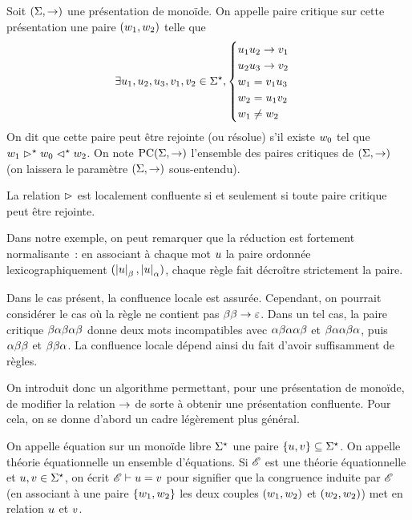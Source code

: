 \begin{definition}
  Soit $(\Sigma,\mathrel{\to})$ une présentation de monoïde. On appelle paire
  critique sur cette présentation une paire $(w_1,w_2)$
  telle que
  \[\exists u_1,u_2,u_3,v_1,v_2\in\Sigma^{\star},
  \begin{cases}
    u_1u_2\mathrel{\to} v_1\\
    u_2u_3\mathrel{\to} v_2\\
    w_1 = v_1u_3\\
    w_2 = u_1v_2\\
    w_1 \neq w_2
  \end{cases}\]
  On dit que cette paire peut être rejointe (ou résolue) s'il existe
  $w_0$ tel que $w_1\mathrel{\rhd}^{\mathord{\star}} w_0\mathrel{\lhd}^{\mathord{\star}} w_2$.
  On note $\operatorname{PC}(\Sigma,\mathrel{\to})$ l'ensemble des paires critiques de
  $(\Sigma,\mathrel{\to})$ (on laissera le paramètre $(\Sigma,\mathrel{\to})$ sous-entendu).
\end{definition}

\begin{remark}
  La relation $\mathrel{\rhd}$ est localement confluente si et seulement si toute
  paire critique peut être rejointe.
\end{remark}

Dans notre exemple, on peut remarquer que la réduction est fortement
normalisante~: en associant à chaque mot $u$ la paire ordonnée
lexicographiquement $(\left|u\right|_{\beta},\left|u\right|_{\alpha})$, chaque règle fait
décroître strictement la paire.

Dans le cas présent, la confluence locale est assurée. Cependant, on pourrait
considérer le cas où la règle ne contient pas $\beta\beta\mathrel{\to} \varepsilon$. Dans
un tel cas, la paire critique $\beta\alpha\beta\alpha\beta$ donne deux mots
incompatibles avec $\alpha\beta\alpha\alpha\beta$ et
$\beta\alpha\alpha\beta\alpha$, puis $\alpha\beta\beta$ et
$\beta\beta\alpha$. La confluence locale dépend ainsi du fait d'avoir
suffisamment de règles.

On introduit donc un algorithme permettant, pour une présentation de monoïde,
de modifier la relation $\mathrel{\to}$ de sorte à obtenir une présentation
confluente. Pour cela, on se donne d'abord un cadre légèrement plus général.

\begin{definition}
  On appelle équation sur un monoïde libre $\Sigma^{\star}$ une paire
  $\{u,v\} \subseteq \Sigma^{\star}$.
  On appelle théorie équationnelle un ensemble d'équations. Si
  $\mathscr{E}$ est une théorie équationnelle et $u,v \in \Sigma^{\star}$,
  on écrit $\mathscr{E}\vdash u = v$ pour signifier que
  la congruence induite par $\mathscr{E}$ (en associant à une paire
  $\{w_1,w_2\}$ les deux couples $(w_1,w_2)$ et
  $(w_2,w_2)$) met en relation $u$ et $v$.
\end{definition}


